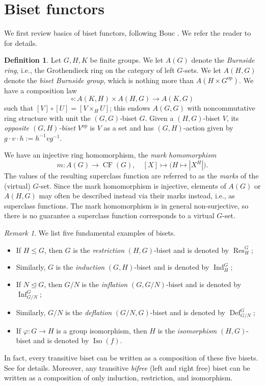 \documentclass[]{amsart}
\newcommand{\inv}{^{-1}}
\newcommand{\op}{^{\operatorname{op}}}
\newcommand{\Res}{\operatorname{Res}}
\newcommand{\Ind}{\operatorname{Ind}}
\newcommand{\Inf}{\operatorname{Inf}}
\newcommand{\Def}{\operatorname{Def}}
\newcommand{\Iso}{\operatorname{Iso}}
\newcommand{\on}[1]{\operatorname{#1}}
\theoremstyle{remark}
\newtheorem{remark}[theorem]{Remark}
\theoremstyle{definition}
\newtheorem{definition}[theorem]{Definition}
\begin{document}
	\section{Biset functors}
	
	We first review basics of biset functors, following Bouc \cite{Bou10}. We refer the reader to \cite[Chapters 2, 3]{Bou10} for details. 
	
	\begin{definition}
		Let $G,H, K$ be finite groups. We let $A(G)$ denote the \emph{Burnside ring}, i.e., the Grothendieck ring on the category of left $G$-sets. We let $A(H,G)$ denote the \emph{biset Burnside group}, which is nothing more than $A(H \times G\op)$. We have a composition law \[\circ\colon A(K,H) \times A(H,G) \to A(K,G)\] such that $[V]\circ [U] = [V\times_H U]$; this endows $A(G,G)$ with noncommutative ring structure with unit the $(G,G)$-biset $G$. Given a $(H,G)$-biset $V$, its \emph{opposite $(G,H)$-biset} $V\op$ is $V$ as a set and has $(G,H)$-action given by $g\cdot v\cdot h := h\inv vg\inv$.
		
		We have an injective ring homomorphism, the \emph{mark homomorphism} \[m\colon A(G) \to \on{CF}(G),\quad [X] \mapsto \big(H \mapsto |X^H|\big).\] The values of the resulting superclass function are referred to as the \emph{marks} of the (virtual) $G$-set. Since the mark homomorphism is injective, elements of $A(G)$ or $A(H,G)$ may often be described instead via their marks instead, i.e., as superclass functions. The mark homomorphism is in general non-surjective, so there is no guarantee a superclass function corresponds to a virtual $G$-set. 
	\end{definition}
	
	\begin{remark}
		We list five fundamental examples of bisets.
		\begin{itemize}
			\item If $H \leq G$, then $G$ is the \emph{restriction} $(H,G)$-biset and is denoted by $\Res^G_H$;
			\item Similarly, $G$ is the \emph{induction} $(G,H)$-biset and is denoted by $\Ind^G_H$;
			\item If $N \trianglelefteq G$, then $G/N$ is the \emph{inflation} $(G,G/N)$-biset and is denoted by $\Inf^G_{G/N}$;
			\item Similarly, $G/N$ is the \emph{deflation} $(G/N, G)$-biset and is denoted by $\Def^G_{G/N}$;
			\item If $\varphi\colon G\to H$ is a group isomorphism, then $H$ is the \emph{isomorphism} $(H,G)$-biset and is denoted by $\Iso(f)$.
		\end{itemize}
		In fact, every transitive biset can be written as a composition of these five bisets. See \cite[Lemma 2.3.26]{Bou10} for details. Moreover, any transitive \emph{bifree} (left and right free) biset can be written as a composition of only induction, restriction, and isomorphism.  
	\end{remark}
	
\end{document}
